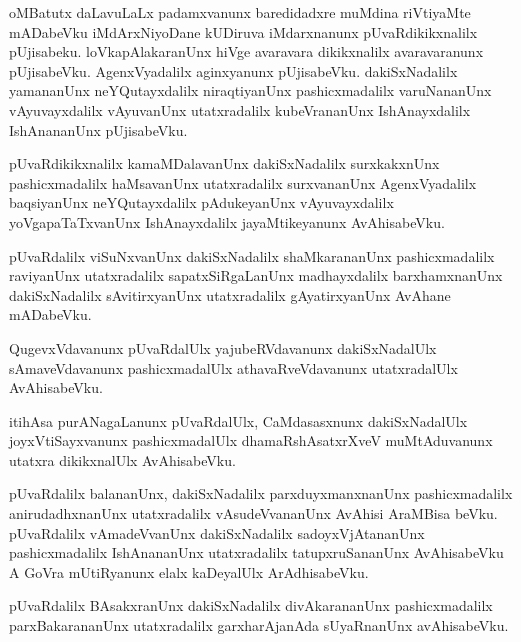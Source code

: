 \begin{mng}
oMBatutx daLavuLaLx padamxvanunx baredidadxre muMdina riVtiyaMte mADabeVku iMdArxNiyoDane kUDiruva iMdarxnanunx pUvaRdikikxnalilx pUjisabeku. loVkapAlakaranUnx hiVge avaravara dikikxnalilx avaravaranunx pUjisabeVku. AgenxVyadalilx aginxyanunx pUjisabeVku. dakiSxNadalilx yamananUnx neYQutayxdalilx niraqtiyanUnx pashicxmadalilx varuNananUnx vAyuvayxdalilx vAyuvanUnx utatxradalilx kubeVrananUnx IshAnayxdalilx IshAnananUnx pUjisabeVku.
\end{mng}

\begin{mng}
pUvaRdikikxnalilx kamaMDalavanUnx dakiSxNadalilx surxkakxnUnx pashicxmadalilx haMsavanUnx utatxradalilx surxvananUnx AgenxVyadalilx baqsiyanUnx neYQutayxdalilx pAdukeyanUnx vAyuvayxdalilx yoVgapaTaTxvanUnx IshAnayxdalilx jayaMtikeyanunx AvAhisabeVku.
\end{mng}

\begin{mng}
pUvaRdalilx viSuNxvanUnx dakiSxNadalilx shaMkarananUnx pashicxmadalilx raviyanUnx utatxradalilx sapatxSiRgaLanUnx madhayxdalilx barxhamxnanUnx dakiSxNadalilx sAvitirxyanUnx utatxradalilx gAyatirxyanUnx AvAhane mADabeVku.
\end{mng}

\begin{mng}
QugevxVdavanunx pUvaRdalUlx yajubeRVdavanunx dakiSxNadalUlx sAmaveVdavanunx pashicxmadalUlx athavaRveVdavanunx utatxradalUlx AvAhisabeVku.
\end{mng}

\begin{mng}
itihAsa purANagaLanunx pUvaRdalUlx, CaMdasasxnunx dakiSxNadalUlx joyxVtiSayxvanunx pashicxmadalUlx dhamaRshAsatxrXveV muMtAduvanunx utatxra dikikxnalUlx AvAhisabeVku.
\end{mng}

\begin{mng}
pUvaRdalilx balananUnx, dakiSxNadalilx parxduyxmanxnanUnx pashicxmadalilx anirudadhxnanUnx utatxradalilx vAsudeVvananUnx AvAhisi AraMBisa beVku. pUvaRdalilx vAmadeVvanUnx dakiSxNadalilx sadoyxVjAtananUnx pashicxmadalilx IshAnananUnx utatxradalilx tatupxruSananUnx AvAhisabeVku A GoVra mUtiRyanunx elalx kaDeyalUlx ArAdhisabeVku.
\end{mng}

\begin{mng}
pUvaRdalilx BAsakxranUnx dakiSxNadalilx divAkarananUnx pashicxmadalilx parxBakarananUnx utatxradalilx garxharAjanAda sUyaRnanUnx avAhisabeVku. 
\end{mng}


